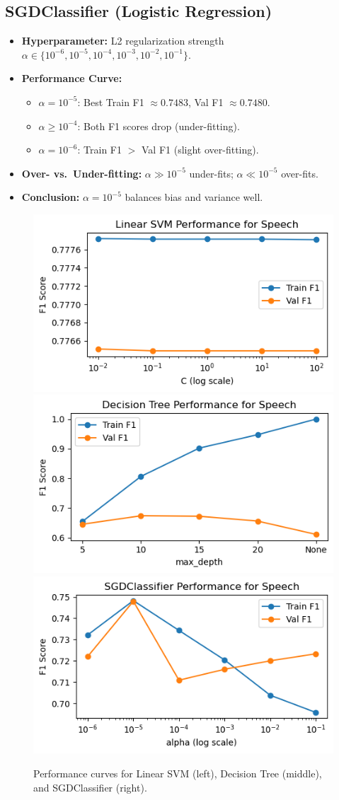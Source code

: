 \documentclass{article}
\begin{document}
\subsection{SGDClassifier (Logistic Regression)}
\begin{itemize}
  \item \textbf{Hyperparameter:} L2 regularization strength $\alpha \in \{10^{-6},10^{-5},10^{-4},10^{-3},10^{-2},10^{-1}\}$.
  \item \textbf{Performance Curve:}
    \begin{itemize}
      \item $\alpha=10^{-5}$: Best Train F1 $\approx0.7483$, Val F1 $\approx0.7480$.
      \item $\alpha\ge10^{-4}$: Both F1 scores drop (under-fitting).
      \item $\alpha=10^{-6}$: Train F1 $>$ Val F1 (slight over-fitting).
    \end{itemize}
  \item \textbf{Over- vs.\ Under-fitting:} \(\alpha\gg10^{-5}\) under-fits; \(\alpha\ll10^{-5}\) over-fits.
  \item \textbf{Conclusion:} $\alpha=10^{-5}$ balances bias and variance well.
\end{itemize}

\begin{figure}[h]
  \centering
  \includegraphics[width=0.3\linewidth]{tang/svm.png}
  \hfill
  \includegraphics[width=0.3\linewidth]{tang/dt.png}
  \hfill
  \includegraphics[width=0.3\linewidth]{tang/sgd.png}
  \caption{Performance curves for Linear SVM (left), Decision Tree (middle), and SGDClassifier (right).}
  \label{fig:hp_curves}
\end{figure}
\end{document}
